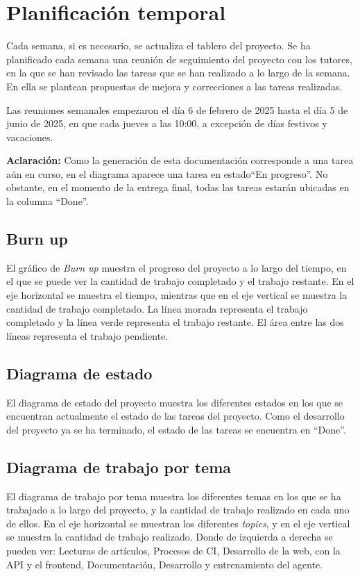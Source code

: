 \section{Planificación temporal}
Cada semana, si es necesario, se actualiza el tablero del proyecto.
Se ha planificado cada semana una reunión de seguimiento del proyecto con los tutores, en la que se han revisado las tareas que se han realizado a lo largo de la semana. En ella se plantean propuestas de mejora y correcciones a las tareas realizadas.

Las reuniones semanales empezaron el día 6 de febrero de 2025 hasta el día 5 de junio de 2025, en que cada jueves a las 10:00, a excepción de días festivos y vacaciones.

\textbf{Aclaración:} Como la generación de esta documentación corresponde a una tarea aún en curso, en el diagrama aparece una tarea en estado``En progreso''. No obstante, en el momento de la entrega final, todas las tareas estarán ubicadas en la columna ``Done''.

\subsection{Burn up}
El gráfico de \textit{Burn up} muestra el progreso del proyecto a lo largo del tiempo, en el que se puede ver la cantidad de trabajo completado y el trabajo restante. En el eje horizontal se muestra el tiempo, mientras que en el eje vertical se muestra la cantidad de trabajo completado. La línea morada representa el trabajo completado y la línea verde representa el trabajo restante. El área entre las dos líneas representa el trabajo pendiente.


\subsection{Diagrama de estado}
El diagrama de estado del proyecto muestra los diferentes estados en los que se encuentran actualmente el estado de las tareas del proyecto. Como el desarrollo del proyecto ya se ha terminado, el estado de las tareas se encuentra en ``Done''. 



\subsection{Diagrama de trabajo por tema}
El diagrama de trabajo por tema muestra los diferentes temas en los que se ha trabajado a lo largo del proyecto, y la cantidad de trabajo realizado en cada uno de ellos. En el eje horizontal se muestran los diferentes \textit{topics}, y en el eje vertical se muestra la cantidad de trabajo realizado.
Donde de izquierda a derecha se pueden ver: Lecturas de artículos,  Procesos de CI, Desarrollo de la web, con la API y el frontend, Documentación, Desarrollo y entrenamiento del agente.

